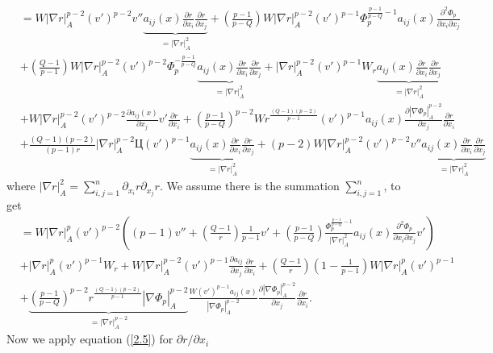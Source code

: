 \documentclass[a4paper,12pt,reqno]{amsart}
\renewcommand\eqref[1]{(\ref{#1})} %
\theoremstyle{theorem}
\numberwithin{equation}{section}
\theoremstyle{plain}
\theoremstyle{definition}
\theoremstyle{defi}
\begin{document}
\begin{align*}
	&=   W |\nabla r|^{p-2}_A ( v')^{p-2} v''\underbrace{a_{ij}(x) \frac{\partial r}{\partial x_i}\frac{\partial r}{\partial x_j}}_{=|\nabla r|^2_A} +  \left(\frac{p-1}{p-Q}\right) W |\nabla r|^{p-2}_A ( v')^{p-1} \Phi_p^{\frac{p-1}{p-Q}-1}a_{ij}(x) \frac{\partial^2 \Phi_p}{\partial x_i\partial x_j} \\
	&+ \left(\frac{Q-1}{p-1}\right) W |\nabla r|^{p-2}_A ( v')^{p-2}\Phi_p^{-\frac{p-1}{p-Q}}\underbrace{a_{ij}(x) \frac{\partial r}{\partial x_i}\frac{\partial r}{\partial x_j}}_{=|\nabla r|^2_A} +|\nabla r|^{p-2}_A ( v')^{p-1}W_r \underbrace{a_{ij}(x) \frac{\partial r}{\partial x_i}\frac{\partial r}{\partial x_j}}_{=|\nabla r|^2_A} \\ 
	&  + W |\nabla r|^{p-2}_A ( v')^{p-2} \frac{\partial a_{ij}(x)}{\partial x_j} v'\frac{\partial r}{\partial x_i} + \left( \frac{p-1}{p-Q}\right)^{p-2} W r^{\frac{(Q-1)(p-2)}{p-1}}(v')^{p-1}a_{ij}(x)  \frac{\partial |\nabla \Phi_p|_A^{p-2}}{\partial x_j}\frac{\partial r}{\partial x_i}\\
	& + \frac{(Q-1)(p-2)}{(p-1)r}|\nabla r|^{p-2}_A Ц(v')^{p-1} \underbrace{a_{ij}(x) \frac{\partial r}{\partial x_i}\frac{\partial r}{\partial x_j}}_{=|\nabla r|^2_A} + (p-2)W|\nabla r|^{p-2}_A (v')^{p-2} v'' \underbrace{a_{ij}(x) \frac{\partial r}{\partial x_i}\frac{\partial r}{\partial x_j}}_{=|\nabla r|^2_A}
\end{align*}
where $|\nabla r|^2_A = \sum_{i,j=1}^n \partial_{x_i}r \partial_{x_j}r$. We assume there is the summation $\sum_{i,j=1}^n$, to get
\begin{align*}
	&=  W |\nabla r|^{p}_A ( v')^{p-2} \left((p-1) v'' + \left(\frac{Q-1}{r}\right)\frac{1}{p-1} v' + \left(\frac{p-1}{p-Q}\right)\frac{\Phi_p^{\frac{p-1}{p-Q}-1}}{|\nabla r|_A^2} a_{ij}(x) \frac{\partial^2 \Phi_p}{\partial x_i \partial x_j} v'\right)\\
	& + |\nabla r|_A^p (v')^{p-1}W_r + W|\nabla r|_A^{p-2}(v')^{p-1} \frac{\partial a_{ij}}{\partial x_j}\frac{\partial r}{\partial x_i} + \left(\frac{Q-1}{r}\right)\left(1 - \frac{1}{p-1}\right)W |\nabla r|_A^p (v')^{p-1}\\
	&  + \underbrace{\left( \frac{p-1}{p-Q}\right)^{p-2}  r^{\frac{(Q-1)(p-2)}{p-1}} |\nabla \Phi_p|^{p-2}_A}_{=|\nabla r|_A^{p-2}} \frac{W(v')^{p-1}a_{ij}(x)}{ |\nabla \Phi_p|^{p-2}_A}  \frac{\partial |\nabla \Phi_p|_A^{p-2}}{\partial x_j}\frac{\partial r}{\partial x_i}.
\end{align*}
Now we apply equation \eqref{2.5} for $\partial r  / \partial x_i$
\end{document}
